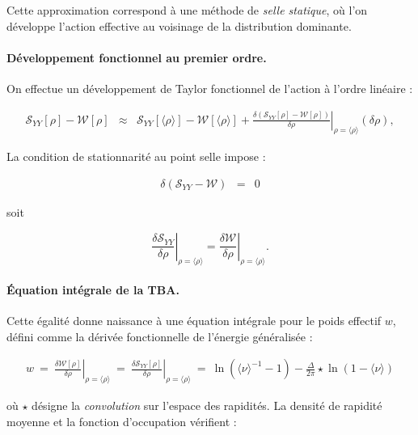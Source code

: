 Cette approximation correspond à une méthode de \textit{selle statique}, où l’on développe l’action effective au voisinage de la distribution dominante.


\paragraph{Développement fonctionnel au premier ordre.}

On effectue un développement de Taylor fonctionnel de l'action à l’ordre linéaire :

\begin{eqnarray*}
	\mathcal{S}_{YY}[\rho] - \mathcal{W}[\rho] & \approx & \mathcal{S}_{YY}[\langle\rho\rangle] - \mathcal{W}[\langle\rho\rangle] +  \left. \frac{\delta (\mathcal{S}_{YY}[\rho] - \mathcal{W}[\rho]) }{\delta \rho} \right|_{\rho = \langle \rho \rangle }	(\delta \rho),
	\label{chap:TBA:eq:action}	
\end{eqnarray*}	


La condition de stationnarité au point selle impose :

\begin{eqnarray*}
	\delta (\mathcal{S}_{YY} - \mathcal{W}) & = & 0  	
\end{eqnarray*}

soit 

\begin{equation}
\left. \frac{\delta \mathcal{S}_{YY}}{\delta \rho} \right|_{\rho = \langle \rho \rangle} = \left. \frac{\delta \mathcal{W}}{\delta \rho} \right|_{\rho = \langle \rho \rangle}.
\end{equation}

\paragraph{Équation intégrale de la TBA.}

Cette égalité donne naissance à une équation intégrale pour le poids effectif \( w \), défini comme la dérivée fonctionnelle de l'énergie généralisée :

\begin{eqnarray*}
	w ~=~ \left. \frac{\delta \mathcal{W}[\rho]}{\delta \rho} \right|_{\rho = \langle \rho \rangle } ~= ~\left. \frac{\delta \mathcal{S}_{YY}[\rho]}{\delta \rho} \right|_{\rho = \langle \rho \rangle } ~=~ \ln ( \langle \nu \rangle^{-1}  - 1 ) - \frac{\Delta}{2\pi} \star \ln ( 1 -  \langle \nu \rangle )
\end{eqnarray*}

où \( \star \) désigne la \textit{convolution} sur l’espace des rapidités. La densité de rapidité moyenne et la fonction d’occupation vérifient :

